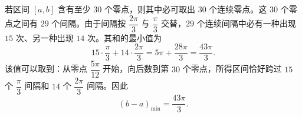 \begin{answer}
若区间 $[a,b]$ 含有至少 $30$ 个零点，则其中必可取出 $30$ 个连续零点。这 $30$ 个零点之间有 $29$ 个间隔。由于间隔按 $\dfrac{2\pi}{3}$ 与 $\dfrac{\pi}{3}$ 交替，$29$ 个连续间隔中必有一种出现 $15$ 次、另一种出现 $14$ 次。其和的最小值为
\nopagebreak[4]
\[15\cdot\frac{\pi}{3}+14\cdot\frac{2\pi}{3}
=5\pi+\frac{28\pi}{3}
=\frac{43\pi}{3}.\]
该值可以取到：从零点 $\dfrac{5\pi}{12}$ 开始，向后数到第 $30$ 个零点，所得区间恰好跨过 $15$ 个 $\dfrac{\pi}{3}$ 间隔和 $14$ 个 $\dfrac{2\pi}{3}$ 间隔。因此
\nopagebreak[4]
\[(b-a)_{\min}=\frac{43\pi}{3}.\]

\gkanswer{答案（1）：$\left(0,\dfrac34\right]$。需 $\left[-\dfrac{\pi}{4},\dfrac{2\pi}{3}\right]\subseteq\left[-\dfrac{\pi}{2\omega},\dfrac{\pi}{2\omega}\right]$，故 $\omega\leqslant\dfrac34$。}


\end{answer}
